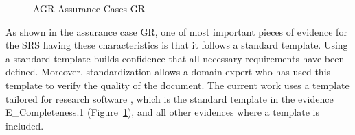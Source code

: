 \begin{figure}[hp]
    \centering
    \caption[AGR Assurance Cases GR]{AGR Assurance Cases GR}
    \label{fig_agr_ac_gr}
\end{figure}

As shown in the assurance case GR, one of most important pieces of evidence for the SRS having these characteristics is that it follows a standard template. Using  a standard template builds confidence that all necessary requirements have been defined. Moreover, standardization allows a domain expert who has used this template to verify the quality of the document. The current work uses a template tailored for research software \cite{Smith2006}, which is the standard template in the evidence E\_Completeness.1 (Figure~\ref{fig_agr_ac_gr}), and all other evidences where a template is included.

